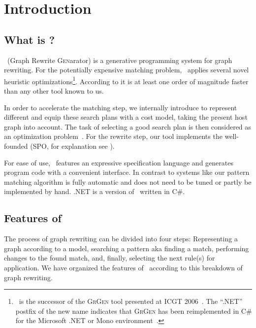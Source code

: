\chapter{Introduction}


\section{What is \GrG?}

\GrG\ (\textsc{G}raph \textsc{R}ewrite \textsc{Gen}arator) is a generative programming system for graph rewriting.
For the potentially expensive matching problem, \GrG\ applies several novel heuristic optimizations\footnote{\GrG\ is the successor of the \textsc{GrGen} tool presented at ICGT 2006~\cite{GBGHS:06}. The ``.NET'' postfix of the new name indicates that \textsc{GrGen} has been reimplemented in C\# for the Microsoft .NET or Mono environment~\cite{NET,MONO}.}.
According to  it is at least one order of magnitude faster than any other tool known to us.

In order to accelerate the matching step, we internally introduce  to represent different  and equip these search plans with a cost model, taking the present host graph into account.
The task of selecting a good search plan is then considered as an optimization problem~\cite{BGK:07,Bat:06}.
For the rewrite step, our tool implements the well-founded  (SPO, for explanation see \cite{spoapproach}).

For ease of use, \GrG\ features an expressive specification language and generates program code with a convenient interface.
In contrast to systems like  \cite{fujaba} our pattern matching algorithm is fully automatic and does not need to be tuned or partly be implemented by hand.
\GrG.NET is a version of \GrG\ written in C\#.


\section{Features of \GrG}

The process of graph rewriting can be divided into four steps:
Representing a graph according to a model, searching a pattern aka finding a match, performing changes to the found match, and, finally, selecting the next rule(s) for application.
We have organized the features of \GrG\ according to this breakdown of graph rewriting.

